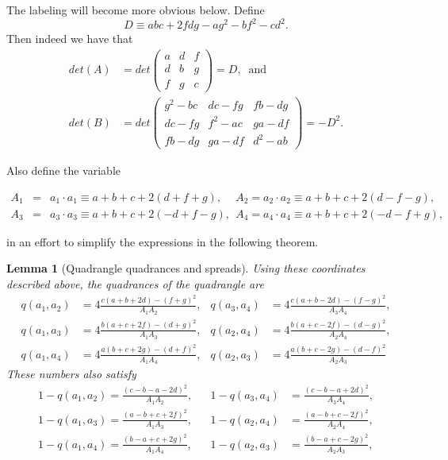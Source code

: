 \documentclass[11pt]{article}
\newtheorem{theorem}{Theorem}
\newtheorem{theorem}{Lemma}
\begin{document}
The labeling will become more obvious below. Define 
\begin{equation*}
D\equiv abc+2fdg-ag^{2}-bf^{2}-cd^{2}.
\end{equation*}%
Then indeed we have that 
\begin{align*}
det(A)& =det%
\begin{pmatrix}
a & d & f \\ 
d & b & g \\ 
f & g & c%
\end{pmatrix}%
=D,\;\;\text{and} \\
det(B)& =det%
\begin{pmatrix}
g^{2}-bc & dc-fg & fb-dg \\ 
dc-fg & f^{2}-ac & ga-df \\ 
fb-dg & ga-df & d^{2}-ab%
\end{pmatrix}%
=-D^{2}.
\end{align*}

Also define the variable

\begin{eqnarray*}
A_{1} &=&a_{1}\cdot a_{1}\equiv a+b+c+2\left( d+f+g\right) ,~\quad
A_{2}=a_{2}\cdot a_{2}\equiv a+b+c+2\left( d-f-g\right) ,~~ \\
A_{3} &=&a_{3}\cdot a_{3}\equiv a+b+c+2\left( -d+f-g\right)
,~~A_{4}=a_{4}\cdot a_{4}\equiv a+b+c+2(-d-f+g),
\end{eqnarray*}

in an effort to simplify the expressions in the following theorem.

\begin{theorem}[Quadrangle quadrances and spreads]
Using these coordinates described above, the quadrances of the quadrangle
are 
\begin{align*}
q(a_{1},a_{2})& =4\frac{c(a+b+2d)-(f+g)^{2}}{A_{1}A_{2}}, & q(a_{3},a_{4})&
=4\frac{c(a+b-2d)-(f-g)^{2}}{A_{3}A_{4}}, \\
q(a_{1},a_{3})& =4\frac{b(a+c+2f)-(d+g)^{2}}{A_{1}A_{3}}, & q(a_{2},a_{4})&
=4\frac{b(a+c-2f)-(d-g)^{2}}{A_{2}A_{4}}, \\
q(a_{1},a_{4})& =4\frac{a(b+c+2g)-(d+f)^{2}}{A_{1}A_{4}}, & q(a_{2},a_{3})&
=4\frac{a(b+c-2g)-(d-f)^{2}}{A_{2}A_{3}}
\end{align*}%
These numbers also satisfy 
\begin{align*}
1-q(a_{1},a_{2})=\frac{(c-b-a-2d)^{2}}{A_{1}A_{2}},& & 1-q(a_{3},a_{4})& =%
\frac{(c-b-a+2d)^{2}}{A_{3}A_{4}}, \\
1-q(a_{1},a_{3})=\frac{(a-b+c+2f)^{2}}{A_{1}A_{3}},& & 1-q(a_{2},a_{4})& =%
\frac{(a-b+c-2f)^{2}}{A_{2}A_{4}}, \\
1-q(a_{1},a_{4})=\frac{(b-a+c+2g)^{2}}{A_{1}A_{4}},& & 1-q(a_{2},a_{3})& =%
\frac{(b-a+c-2g)^{2}}{A_{2}A_{3}},
\end{align*}
\end{theorem}
\end{document}
